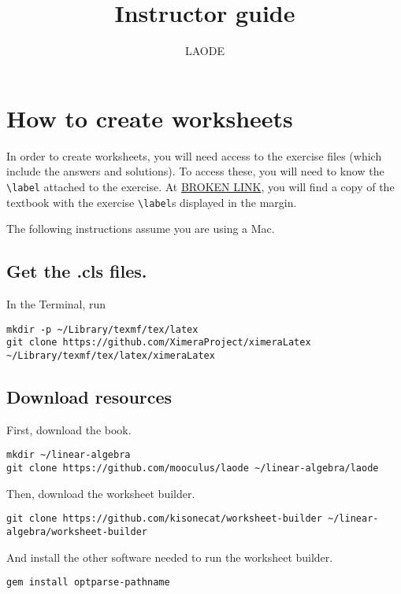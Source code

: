\documentclass{article}
\title{Instructor guide}
\author{LAODE}
\begin{document}
\maketitle
\tableofcontents

\section{How to create worksheets}\label{how-to-create-worksheets}

In order to create worksheets, you will need access to the exercise
files (which include the answers and solutions).  To access these, you
will need to know the \verb|\label| attached to the exercise.  At
\url{BROKEN LINK}, you will find a copy of the textbook with the
exercise \verb|\label|s displayed in the margin.

The following instructions assume you are using a Mac.

\subsection{Get the .cls files.}\label{get-the-.cls-files.}

In the Terminal, run

\begin{verbatim}
mkdir -p ~/Library/texmf/tex/latex
git clone https://github.com/XimeraProject/ximeraLatex ~/Library/texmf/tex/latex/ximeraLatex
\end{verbatim}

\subsection{Download resources}\label{download-resources}

First, download the book.

\begin{verbatim}
mkdir ~/linear-algebra
git clone https://github.com/mooculus/laode ~/linear-algebra/laode
\end{verbatim}

Then, download the worksheet builder.

\begin{verbatim}
git clone https://github.com/kisonecat/worksheet-builder ~/linear-algebra/worksheet-builder
\end{verbatim}

And install the other software needed to run the worksheet builder.

\begin{verbatim}
gem install optparse-pathname
\end{verbatim}
\end{document}
